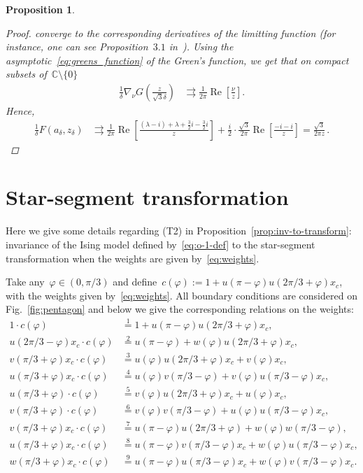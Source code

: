 \documentclass[reqno,11pt,a4paper]{amsart}
\newtheorem{proposition}{Proposition}[section]
\theoremstyle{remark}
\newcommand{\C}{\mathbb{C}}
\renewcommand\Re{\operatorname{Re}}
\begin{document}
\begin{proposition}
\begin{proof}
converge to the corresponding derivatives of the limitting function
(for instance, one can see Proposition~$3.1$ in~\cite{CheSmi12}).
Using the asymptotic~\eqref{eq:greens_function} of the Green's function,
we get that on compact subsets of~$\C\setminus \{0\}$
\begin{align*}
\tfrac{1}{\delta}\nabla_\nu G(\tfrac{z}{\sqrt{3}\delta}) &\rightrightarrows \tfrac{1}{2\pi}\Re \left[ \tfrac{\nu}{z}\right].
\end{align*}
Hence,
\begin{align*}
\tfrac{1}{\delta}F(a_\delta,z_\delta) &\rightrightarrows \tfrac{1}{2\pi} \Re \left[
\frac{(\lambda-i) + \lambda + \tfrac{3}{2}i -  \tfrac{3}{2}i }{z}
\right]
+ \tfrac{i}{2} \cdot \tfrac{\sqrt{3}}{2\pi} \Re \left[
\frac{ -i - i }{z}
\right] = \tfrac{\sqrt{3}}{2\pi z}\,.
\end{align*}
\end{proof}
\end{proposition}


\section{Star-segment transformation}
\label{sec:star-segment}

Here we give some details regarding (T2) in Proposition~\ref{prop:inv-to-transform}: invariance of the Ising model defined by~\eqref{eq:o-1-def} to the star-segment transformation when the weights are given by~\eqref{eq:weights}.

Take any~$\varphi \in (0,\pi/3)$ and define~$c(\varphi):= 1+ u(\pi-\varphi)u(2\pi/3+\varphi)x_c$, with the weights given by~\eqref{eq:weights}.
All boundary conditions are considered on Fig.~\ref{fig:pentagon} and below we give the corresponding relations on the weights:
\begin{align*}
	1\cdot c(\varphi) &\stackrel{1}{=} 1+ u(\pi-\varphi)u(2\pi/3+\varphi)x_c, \\
	u(2\pi/3-\varphi)x_c\cdot c(\varphi) &\stackrel{2}{=} u(\pi-\varphi)+ w(\varphi)u(2\pi/3+\varphi)x_c, \\
	v(\pi/3+\varphi)x_c\cdot c(\varphi) &\stackrel{3}{=} u(\varphi)u(2\pi/3+\varphi)x_c + v(\varphi)x_c, \\
	u(\pi/3+\varphi)x_c\cdot c(\varphi) &\stackrel{4}{=} u(\varphi)v(\pi/3-\varphi) + v(\varphi)u(\pi/3-\varphi)x_c, \\
	u(\pi/3+\varphi)\cdot c(\varphi) &\stackrel{5}{=} v(\varphi)u(2\pi/3+\varphi)x_c + u(\varphi)x_c, \\
	v(\pi/3+\varphi)\cdot c(\varphi) &\stackrel{6}{=} v(\varphi)v(\pi/3-\varphi) + u(\varphi)u(\pi/3-\varphi)x_c, \\
	v(\pi/3+\varphi)x_c\cdot c(\varphi) &\stackrel{7}{=} u(\pi-\varphi)u(2\pi/3+\varphi) + w(\varphi)w(\pi/3-\varphi), \\
	u(\pi/3+\varphi)x_c\cdot c(\varphi) &\stackrel{8}{=} u(\pi-\varphi)v(\pi/3-\varphi)x_c + w(\varphi)u(\pi/3-\varphi)x_c, \\
	w(\pi/3+\varphi)x_c\cdot c(\varphi) &\stackrel{9}{=} u(\pi-\varphi)u(\pi/3-\varphi)x_c + w(\varphi)v(\pi/3-\varphi)x_c.
\end{align*}
\end{document}
